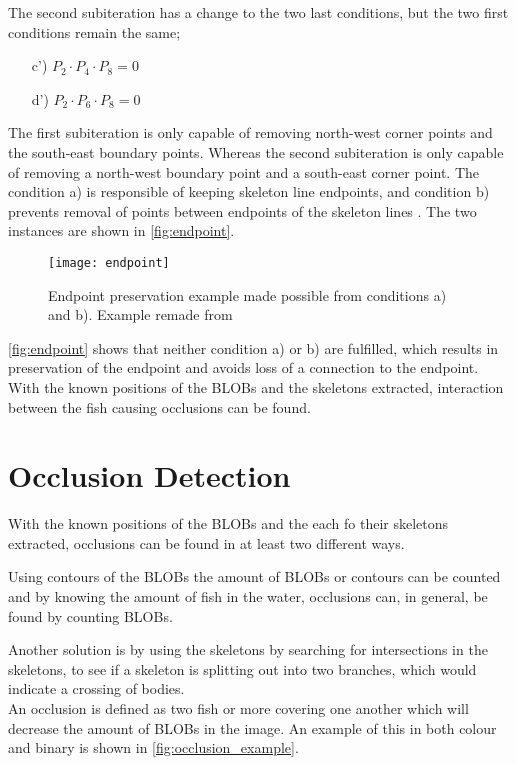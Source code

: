 The second subiteration has a change to the two last conditions, but the two first conditions remain the same;

\begin{itemize}
	\item[c')] $ P_2 \cdot P_4 \cdot P_8 = 0 $
	\item[d')] $ P_2 \cdot P_6 \cdot P_8 = 0 $
\end{itemize}

The first subiteration is only capable of removing north-west corner points and the south-east boundary points. Whereas the second subiteration is only capable of removing a north-west boundary point and a south-east corner point. The condition a) is responsible of keeping skeleton line endpoints, and condition b) prevents removal of points between endpoints of the skeleton lines \citep{Zhang1984}. The two instances are shown in \autoref{fig:endpoint}.

\begin{figure}[H]
	\centering
	\texttt{[image: endpoint]}
	\caption{Endpoint preservation example made possible from conditions a) and b). Example remade from \cite{Zhang1984}}
	\label{fig:endpoint}
\end{figure}

\autoref{fig:endpoint} shows that neither condition a) or b) are fulfilled, which results in preservation of the endpoint and avoids loss of a connection to the endpoint.\\

With the known positions of the BLOBs and the skeletons extracted, interaction between the fish causing occlusions can be found.
\section{Occlusion Detection}
With the known positions of the BLOBs and the each fo their skeletons extracted, occlusions can be found in at least two different ways.

Using contours of the BLOBs the amount of BLOBs or contours can be counted and by knowing the amount of fish in the water, occlusions can, in general, be found by counting BLOBs.

Another solution is by using the skeletons by searching for intersections in the skeletons, to see if a skeleton is splitting out into two branches, which would indicate a crossing of bodies.\\

An occlusion is defined as two fish or more covering one another which will decrease the amount of BLOBs in the image. An example of this in both colour and binary is shown in \autoref{fig:occlusion_example}.

